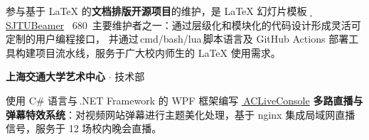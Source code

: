 \documentclass[a4paper]{article}
\newenvironment{cvitems}{
    \begin{justify}
    \begin{description}[
        labelwidth=2.0cm,
        leftmargin=2.5cm,
        labelsep=0.5cm,
        parsep=0pt,
        align=right
    ]
    
}{
    \end{description}
    \end{justify}
}
\begin{document}
\begin{cvitems}
        参与基于 \LaTeX{} 的\textbf{文档排版开源项目}的维护，是 \LaTeX{} 幻灯片模板 \href{https://github.com/sjtug/SJTUBeamer}{\faGithubSquare\,\sffamily SJTUBeamer} \faStar~\textsf{680}~主要维护者之一：通过层级化和模块化的代码设计形成灵活可定制的用户编程接口，%
        并通过\,\textsf{cmd}/\textsf{bash}/\textsf{lua}\,脚本语言及 GitHub Actions 部署工具构建项目流水线，服务于广大校内师生的 \LaTeX{} 使用需求。

        \item[2019.2--2020.7] \textbf{上海交通大学艺术中心} $\cdot$ 技术部%
        
        

        使用 C\# 语言与\,.NET Framework 的 \textsf{WPF} 框架编写 \href{https://github.com/SJTU-Art-Center/ACLiveConsole}{\faGithubSquare\,\textsf{ACLiveConsole}} \textbf{多路直播与弹幕特效系统}：对视频网站弹幕进行主题美化处理，基于 nginx 集成局域网直播信号，服务于 12 场校内晚会直播。
    \end{cvitems}
\end{document}

